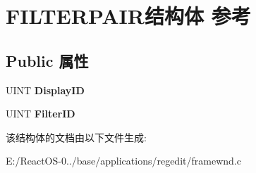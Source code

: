 \hypertarget{struct_f_i_l_t_e_r_p_a_i_r}{}\section{F\+I\+L\+T\+E\+R\+P\+A\+I\+R结构体 参考}
\label{struct_f_i_l_t_e_r_p_a_i_r}
\subsection*{Public 属性}
\begin{DoxyCompactItemize}
\item 
\mbox{\label{struct_f_i_l_t_e_r_p_a_i_r_a9e87ac95e188b7c5d799868fbc180644}} 
U\+I\+NT {\bfseries Display\+ID}
\item 
\mbox{\label{struct_f_i_l_t_e_r_p_a_i_r_a67af9e209ef49eff407924a0b4d20415}} 
U\+I\+NT {\bfseries Filter\+ID}
\end{DoxyCompactItemize}


该结构体的文档由以下文件生成\+:\begin{DoxyCompactItemize}
\item 
E\+:/\+React\+O\+S-\/0../base/applications/regedit/framewnd.\+c\end{DoxyCompactItemize}
